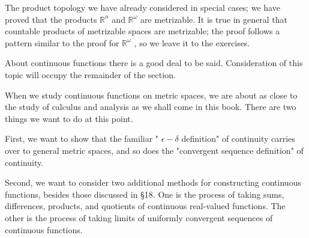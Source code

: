 The product topology we have already considered in special cases; we have proved that the products \({\mathbb{R}}^{n}\) and \({\mathbb{R}}^{\omega }\) are metrizable. It is true in general that countable products of metrizable spaces are metrizable; the proof follows a pattern similar to the proof for \({\mathbb{R}}^{\omega }\) , so we leave it to the exercises.

About continuous functions there is a good deal to be said. Consideration of this topic will occupy the remainder of the section.

When we study continuous functions on metric spaces, we are about as close to the study of calculus and analysis as we shall come in this book. There are two things we want to do at this point.

First, we want to show that the familiar " \(\epsilon  - \delta\) definition" of continuity carries over to general metric spaces, and so does the "convergent sequence definition" of continuity.

Second, we want to consider two additional methods for constructing continuous functions, besides those discussed in §18. One is the process of taking sums, differences, products, and quotients of continuous real-valued functions. The other is the process of taking limits of uniformly convergent sequences of continuous functions.

